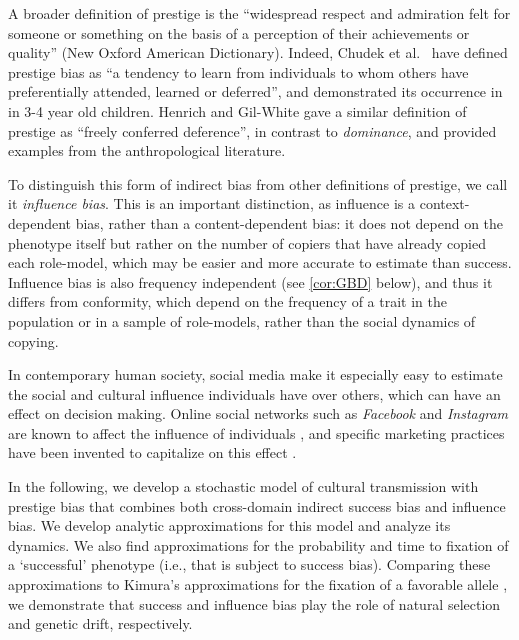 \documentclass[12pt]{extarticle}
\begin{document}
A broader definition of prestige is the ``widespread respect and admiration felt for someone or something on the basis of a perception of their achievements or quality'' (New Oxford American Dictionary).
Indeed, Chudek et al.~\citep{prestige_cultural_learning} have defined prestige bias as ``a tendency to learn from individuals to whom others have preferentially attended, learned or deferred'', and demonstrated its occurrence in in 3-4 year old children.
{Henrich and Gil-White} \citep{prestige_evolution} gave a similar definition of prestige as ``freely conferred deference'', in contrast to \emph{dominance}, and provided examples from the anthropological literature.

To distinguish this form of indirect bias from other definitions of prestige, we call it \emph{influence bias}.
This is an important distinction, as influence is a context-dependent bias, rather than a content-{dependent} bias: it does not depend on the phenotype itself but rather on the number of copiers that have already copied each role-model, which may be easier and more accurate to estimate than success. 
Influence bias is also frequency independent (see \cref{cor:GBD} below), and thus it differs from conformity, which depend on the frequency of a trait in the population or in a sample of role-models, rather than the social dynamics of copying.

In contemporary human society, social media make it especially easy to estimate the social and cultural influence individuals have over others, which can have an effect on decision making. Online social networks such as \emph{Facebook} and \emph{Instagram} are known to affect the influence of individuals \citep{social_influence,social_media,influence_analysis}, and specific marketing practices have been invented to capitalize on this effect \citep{facebook_marketing}.

In the following, we develop a stochastic model of cultural transmission with prestige bias that combines both cross-domain indirect success bias and influence bias.
We develop analytic approximations for this model and analyze its dynamics. We also find approximations for the probability and time to fixation of a `successful' phenotype (i.e., that is {subject to} success bias). Comparing these approximations to Kimura's approximations for the fixation of a favorable allele \citep{kimura,kimura_average}, we demonstrate that success and influence bias play the role of natural selection and genetic drift, respectively. 

\end{document}
